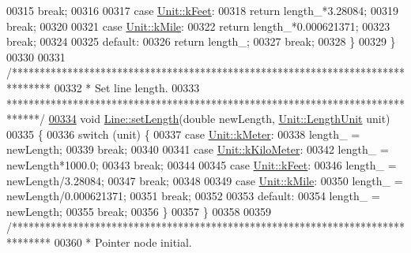 \begin{DoxyCode}
00315     \textcolor{keywordflow}{break};
00316 
00317   \textcolor{keywordflow}{case} \hyperlink{class_unit_a8c8921f7b225ad6063b1cb573425b9a0a9ac9b167b0ebce477fb53d6ace04ddc8}{Unit::kFeet}:
00318     \textcolor{keywordflow}{return} length\_*3.28084;
00319     \textcolor{keywordflow}{break};
00320 
00321   \textcolor{keywordflow}{case} \hyperlink{class_unit_a8c8921f7b225ad6063b1cb573425b9a0a2ebde742068bbee0510de32fbb4cd724}{Unit::kMile}:
00322     \textcolor{keywordflow}{return} length\_*0.000621371;
00323     \textcolor{keywordflow}{break};
00324 
00325   \textcolor{keywordflow}{default}:
00326     \textcolor{keywordflow}{return} length\_;
00327     \textcolor{keywordflow}{break};
00328   \}
00329 \}
00330 
00331 \textcolor{comment}{/*******************************************************************************}
00332 \textcolor{comment}{ * Set line length.}
00333 \textcolor{comment}{ ******************************************************************************/}
\hypertarget{line_8cpp_source_l00334}{}\hyperlink{group___models_ga950d0b8f5d167eda430c65ca7adadbb0}{00334} \textcolor{keywordtype}{void} \hyperlink{group___models_ga950d0b8f5d167eda430c65ca7adadbb0}{Line::setLength}(\textcolor{keywordtype}{double} newLength, \hyperlink{class_unit_a8c8921f7b225ad6063b1cb573425b9a0}{Unit::LengthUnit} unit)
00335 \{
00336   \textcolor{keywordflow}{switch} (unit) \{
00337   \textcolor{keywordflow}{case} \hyperlink{class_unit_a8c8921f7b225ad6063b1cb573425b9a0abfa41ebe7ee649a1f02c9b8ae570434b}{Unit::kMeter}:
00338     length\_ = newLength;
00339     \textcolor{keywordflow}{break};
00340 
00341   \textcolor{keywordflow}{case} \hyperlink{class_unit_a8c8921f7b225ad6063b1cb573425b9a0a1c04f3dd196dbe1832a2658215b0d919}{Unit::kKiloMeter}:
00342     length\_ = newLength*1000.0;
00343     \textcolor{keywordflow}{break};
00344 
00345   \textcolor{keywordflow}{case} \hyperlink{class_unit_a8c8921f7b225ad6063b1cb573425b9a0a9ac9b167b0ebce477fb53d6ace04ddc8}{Unit::kFeet}:
00346     length\_ = newLength/3.28084;
00347     \textcolor{keywordflow}{break};
00348 
00349   \textcolor{keywordflow}{case} \hyperlink{class_unit_a8c8921f7b225ad6063b1cb573425b9a0a2ebde742068bbee0510de32fbb4cd724}{Unit::kMile}:
00350     length\_ = newLength/0.000621371;
00351     \textcolor{keywordflow}{break};
00352 
00353   \textcolor{keywordflow}{default}:
00354     length\_ = newLength;
00355     \textcolor{keywordflow}{break};
00356   \}
00357 \}
00358 
00359 \textcolor{comment}{/*******************************************************************************}
00360 \textcolor{comment}{ * Pointer node initial.}

\end{DoxyCode}
